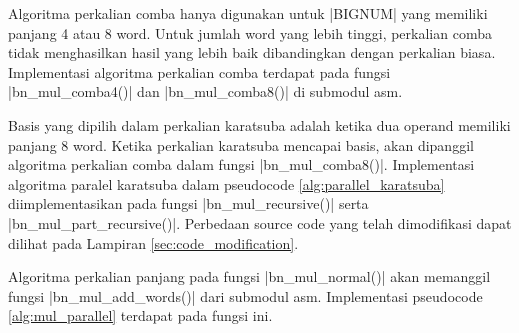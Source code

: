   Algoritma perkalian comba hanya digunakan untuk |BIGNUM| yang memiliki panjang 4 atau 8 word. Untuk jumlah word yang lebih tinggi, perkalian comba tidak menghasilkan hasil yang lebih baik dibandingkan dengan perkalian biasa. Implementasi algoritma perkalian comba terdapat pada fungsi |bn_mul_comba4()| dan |bn_mul_comba8()| di submodul asm.

  Basis yang dipilih dalam perkalian karatsuba adalah ketika dua operand memiliki panjang 8 word. Ketika perkalian karatsuba mencapai basis, akan dipanggil algoritma perkalian comba dalam fungsi |bn_mul_comba8()|. Implementasi algoritma paralel karatsuba dalam pseudocode \ref{alg:parallel_karatsuba} diimplementasikan pada fungsi |bn_mul_recursive()| serta |bn_mul_part_recursive()|. Perbedaan source code yang telah dimodifikasi dapat dilihat pada Lampiran \ref{sec:code_modification}.

  Algoritma perkalian panjang pada fungsi |bn_mul_normal()| akan memanggil fungsi |bn_mul_add_words()| dari submodul asm. Implementasi pseudocode \ref{alg:mul_parallel} terdapat pada fungsi ini.
